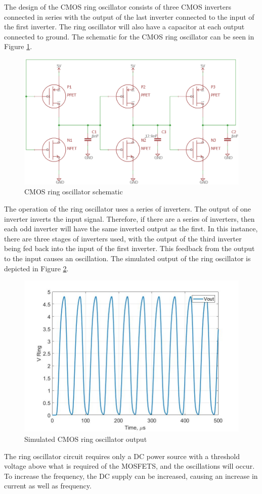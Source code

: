 
The design of the CMOS ring oscillator consists of three CMOS inverters connected in series with the
output of the last inverter connected to the input of the first inverter. The ring oscillator will also have a
capacitor at each output connected to ground. The schematic for the CMOS ring oscillator can be seen in Figure \ref{fig:ringoscillatorcmosexp}.

\begin{figure}[H]
	\centering
	\includegraphics[width=0.5\linewidth]{CircuitDevelopment/RingOscillatorCMOSexp.png}
	\caption{CMOS ring oscillator schematic}
	\label{fig:ringoscillatorcmosexp}
\end{figure}


The operation of the ring oscillator uses a series of inverters. The output of one inverter inverts the input signal. Therefore, if there are a series of inverters, then each odd inverter will have the same inverted output as the first. In this instance, there are three stages of inverters used, with the output of the third inverter being fed back into the input of the first inverter. This feedback from the output to the input causes an oscillation. The simulated output of the ring oscillator is depicted in Figure \ref{fig:ringoscsimlab4}.

\begin{figure}[H]
	\centering
	\includegraphics[width=0.7\linewidth]{CircuitDevelopment/ringoscsimlab4.jpg}
	\caption{Simulated CMOS ring oscillator output}
	\label{fig:ringoscsimlab4}
\end{figure}


The ring oscillator circuit requires only a DC power source with a threshold voltage above what is required of the MOSFETS, and the oscillations will occur. To increase the frequency, the DC supply can be increased, causing an increase in current as well as frequency. 




